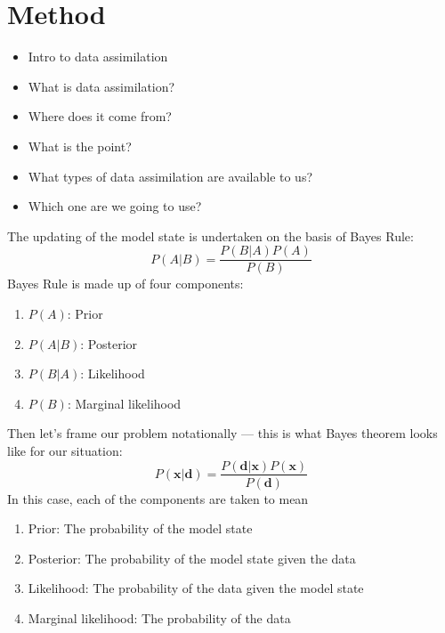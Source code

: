 \chapter{Method}\label{ch:method}

\begin{itemize}
    \item Intro to data assimilation
    \item What is data assimilation?
    \item Where does it come from?
    \item What is the point?
    \item What types of data assimilation are available to us?
    \item Which one are we going to use?
\end{itemize}

The updating of the model state is undertaken on the basis of Bayes Rule:
\begin{equation}
    P(A|B) = \frac{P(B|A) P(A)}{P(B)}
\end{equation}
Bayes Rule is made up of four components:
\begin{enumerate}
    \item $P \left( A \right)$: Prior
    \item $P \left( A|B \right)$: Posterior
    \item $P \left( B|A \right)$: Likelihood
    \item $P \left( B \right)$: Marginal likelihood
\end{enumerate}

Then let's frame our problem notationally --- this is what Bayes theorem looks
like for our situation:
\begin{equation}
    P \left( \mathbf{x} | \mathbf{d} \right) =
       \frac{P \left( \mathbf{d} | \mathbf{x} \right)
             P \left( \mathbf{x} \right)}{P \left( \mathbf{d} \right)} 
\end{equation}
In this case, each of the components are taken to mean
\begin{enumerate}
    \item Prior: The probability of the model state
    \item Posterior: The probability of the model state given the data
    \item Likelihood: The probability of the data given the model state
    \item Marginal likelihood: The probability of the data
\end{enumerate}


